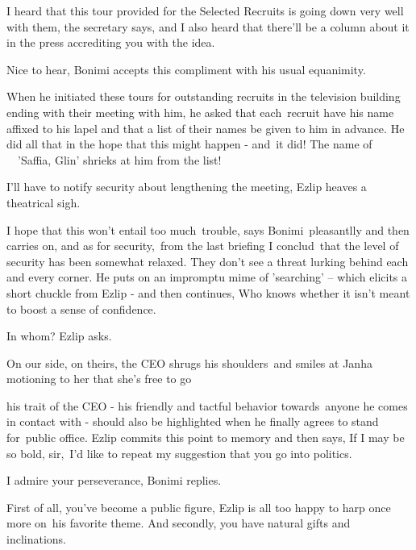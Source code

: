 \documentclass[twoside,11pt]{book}
\begin{document}
{\textquotedbl}I heard that this tour provided for the Selected Recruits is going down very well with
them,{\textquotedbl} the secretary says, {\textquotedbl}and I also heard that there'll be a column about it in the
press accrediting you with the idea.{\textquotedbl}

{\textquotedbl}Nice to hear,{\textquotedbl} Bonimi accepts this compliment with his usual equanimity. 

When he initiated these tours for outstanding recruits in the television building ending with their meeting with him, he
asked that each\ recruit have his name affixed to his lapel and that a list of their names be given to him in advance.
He did all that in the hope that this might  happen - and{\ }it did! The name
of ~~{}'Saffia, Glin' shrieks at him from the list!\ 

{\textquotedbl}I'll have to notify security about lengthening the meeting,{\textquotedbl} Ezlip heaves a theatrical
sigh. 

{\textquotedbl}I hope that this won't entail too much~trouble,{\textquotedbl} says Bonimi\ pleasantlly and then carries
on, {\textquotedbl}and as for security,\ from the last briefing I conclud\textit{\ }that the level of security has been
somewhat relaxed. They don't see a threat lurking behind each and every corner.{\textquotedbl} He puts on an impromptu
mime of {}'searching{}' -- which elicits a short chuckle from Ezlip - and then continues, {\textquotedbl}Who knows
whether it isn't meant to boost a sense of confidence.{\textquotedbl} 

{\textquotedbl}In whom?{\textquotedbl} Ezlip asks. 

{\textquotedbl}On our side, on theirs,{\textquotedbl} the CEO shrugs his shoulders\ and smiles at Janha motioning to her
that she's free to go 

his trait of the CEO - his friendly and tactful behavior towards\ anyone he comes in contact with - should also be
highlighted when he finally agrees to stand for~public office.  Ezlip commits this point to memory and then says,
{\textquotedbl}If I may be so bold, sir,\ I'd like to repeat my suggestion that you go into politics.{\textquotedbl} 

{\textquotedbl}I admire your perseverance,{\textquotedbl} Bonimi replies. 

{\textquotedbl}First of all, you{}'ve become a public figure,{\textquotedbl} Ezlip is all too happy to harp once more
on\ his favorite theme. {\textquotedbl}And secondly, you have natural gifts and inclinations.{\textquotedbl}
\end{document}
